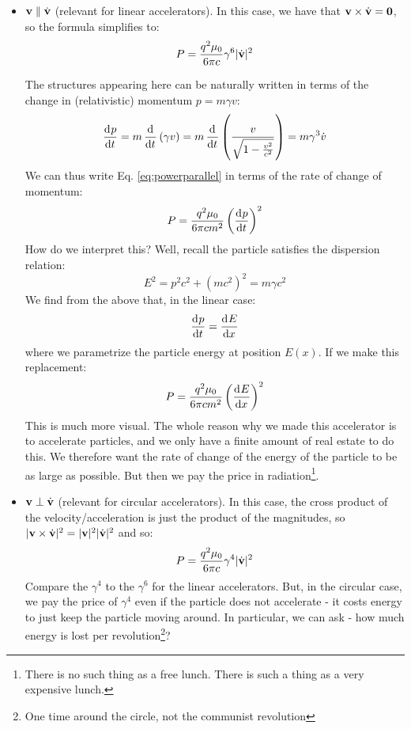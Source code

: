 \begin{itemize}
    \item $\mathbf{v} \parallel \dot{\mathbf{v}}$ (relevant for linear accelerators). In this case, we have that $\mathbf{v} \times \dot{\mathbf{v}} = \mathbf{0}$, so the formula simplifies to:
    \begin{equation}\label{eq:powerparallel}
        P = \frac{q^2\mu_0}{6\pi c}\gamma^6\lvert \dot{\mathbf{v}} \rvert^2
    \end{equation}

    The structures appearing here can be naturally written in terms of the change in (relativistic) momentum $p = m\gamma v$:
    \begin{equation}
        \dod{p}{t} = m\dod{}{t}(\gamma v) = m\dod{}{t}\left(\frac{v}{\sqrt{1 - \frac{v^2}{c^2}}}\right) = m\gamma^3\dot{v}
    \end{equation} 
    We can thus write Eq. \eqref{eq:powerparallel} in terms of the rate of change of momentum:
    \begin{equation}
        P = \frac{q^2\mu_0}{6\pi c m^2}\left(\dod{p}{t}\right)^2
    \end{equation}
    How do we interpret this? Well, recall the particle satisfies the dispersion relation:
    \begin{equation}
        E^2 = p^2c^2 + (mc^2)^2 = m \gamma c^2
    \end{equation}
    We find from the above that, in the linear case:
    \begin{equation}
        \dod{p}{t} = \dod{E}{x}
    \end{equation}
    where we parametrize the particle energy at position $E(x)$. If we make this replacement:
    \begin{equation}
        P = \frac{q^2\mu_0}{6\pi c m^2}\left(\dod{E}{x}\right)^2
    \end{equation}
    This is much more visual. The whole reason why we made this accelerator is to accelerate particles, and we only have a finite amount of real estate to do this. We therefore want the rate of change of the energy of the particle to be as large as possible. But then we pay the price in radiation\footnote{There is no such thing as a free lunch. There is such a thing as a very expensive lunch.}.

    \item $\mathbf{v} \perp \dot{\mathbf{v}}$ (relevant for circular accelerators). In this case, the cross product of the velocity/acceleration is just the product of the magnitudes, so $\lvert \mathbf{v} \times \dot{\mathbf{v}} \rvert^2 = \lvert \mathbf{v} \rvert^2\lvert \dot{\mathbf{v}} \rvert^2$ and so:
    \begin{equation}
        P = \frac{q^2\mu_0}{6\pi c}\gamma^4\lvert \dot{\mathbf{v}} \rvert^2
    \end{equation}
    Compare the $\gamma^4$ to the $\gamma^6$ for the linear accelerators. But, in the circular case, we pay the price of $\gamma^4$ even if the particle does not accelerate - it costs energy to just keep the particle moving around. In particular, we can ask - how much energy is lost per revolution\footnote{One time around the circle, not the communist revolution}?


\end{itemize}
